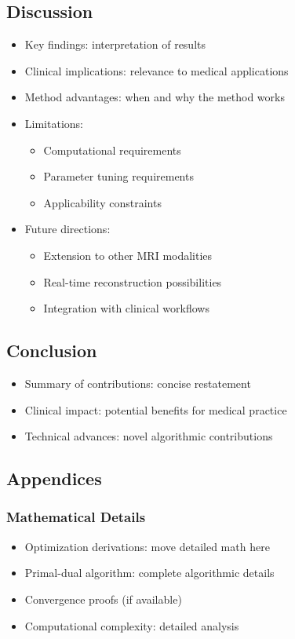 \documentclass[journal,twoside,web]{ieeecolor}
\begin{document}
\subsection{Discussion}
\begin{itemize}
    \item Key findings: interpretation of results
    \item Clinical implications: relevance to medical applications
    \item Method advantages: when and why the method works
    \item Limitations:
    \begin{itemize}
        \item Computational requirements
        \item Parameter tuning requirements
        \item Applicability constraints
    \end{itemize}
    \item Future directions:
    \begin{itemize}
        \item Extension to other MRI modalities
        \item Real-time reconstruction possibilities
        \item Integration with clinical workflows
    \end{itemize}
\end{itemize}

\subsection{Conclusion}
\begin{itemize}
    \item Summary of contributions: concise restatement
    \item Clinical impact: potential benefits for medical practice
    \item Technical advances: novel algorithmic contributions
\end{itemize}

\subsection{Appendices}

\subsubsection{Mathematical Details}
\begin{itemize}
    \item Optimization derivations: move detailed math here
    \item Primal-dual algorithm: complete algorithmic details
    \item Convergence proofs (if available)
    \item Computational complexity: detailed analysis
\end{itemize}
\end{document}
